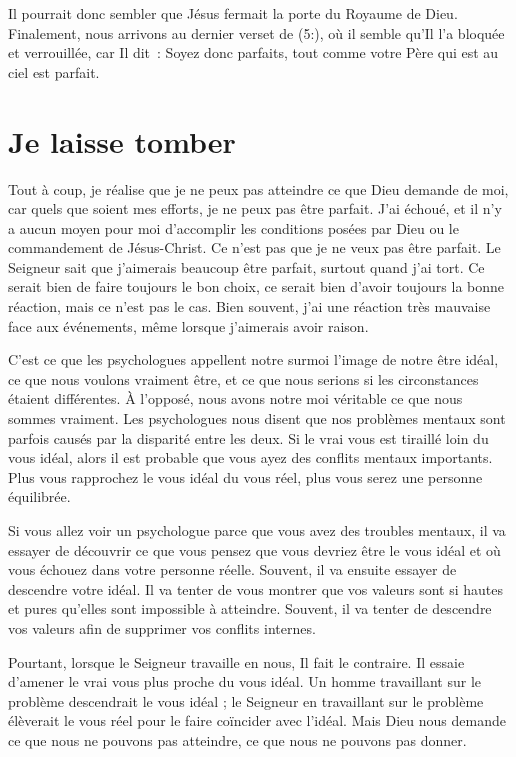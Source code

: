 Il pourrait donc sembler que Jésus fermait la porte du Royaume de Dieu.
 Finalement, nous arrivons au dernier verset de (5:),
 où il semble qu'Il l'a bloquée et verrouillée, car Il dit~:
 \og Soyez donc parfaits,
 tout comme votre Père qui est au ciel est parfait. \fg{}


\section*{Je laisse tomber}

Tout à coup, je réalise que je ne peux pas atteindre
 ce que Dieu demande de moi, car quels que soient mes efforts,
 je ne peux pas être parfait.
 J'ai échoué, et il n'y a aucun moyen pour moi d'accomplir
 les conditions posées par Dieu ou le commandement de Jésus-Christ.
 Ce n'est pas que je ne veux pas être parfait.
 Le Seigneur sait que j'aimerais beaucoup être parfait,
 surtout quand j'ai tort.
 Ce serait bien de faire toujours le bon choix,
 ce serait bien d'avoir toujours la bonne réaction,
 mais ce n'est pas le cas.
 Bien souvent, j'ai une réaction très mauvaise face aux événements,
 même lorsque j'aimerais avoir raison.

C'est ce que les psychologues appellent notre surmoi
 \ocadr l'image de notre être idéal, ce que nous voulons vraiment être,
 et ce que nous serions si les circonstances étaient différentes.
 À l'opposé, nous avons notre moi véritable
 \ocadr ce que nous sommes vraiment.
 Les psychologues nous disent que nos problèmes mentaux
 sont parfois causés par la disparité entre les deux.
 Si le vrai vous est tiraillé loin du vous idéal, alors il est probable
 que vous ayez des conflits mentaux importants.
 Plus vous rapprochez le vous idéal du vous réel,
 plus vous serez une personne équilibrée.

Si vous allez voir un psychologue parce que vous avez des troubles mentaux,
 il va essayer de découvrir ce que vous pensez que vous devriez être
 \ocadr le vous idéal \fcadr{}
 et où vous échouez dans votre personne réelle.
 Souvent, il va ensuite essayer de descendre votre idéal.
 Il va tenter de vous montrer que vos valeurs sont si hautes et pures
 qu'elles sont impossible à atteindre.
 Souvent, il va tenter de descendre vos valeurs
 afin de supprimer vos conflits internes.

Pourtant, lorsque le Seigneur travaille en nous, Il fait le contraire.
 Il essaie d'amener le vrai vous plus proche du vous idéal.
 Un homme travaillant sur le problème descendrait le vous idéal ;
 le Seigneur en travaillant sur le problème élèverait le vous réel
 pour le faire coïncider avec l'idéal.
 Mais Dieu nous demande ce que nous ne pouvons pas atteindre,
 ce que nous ne pouvons pas donner.



